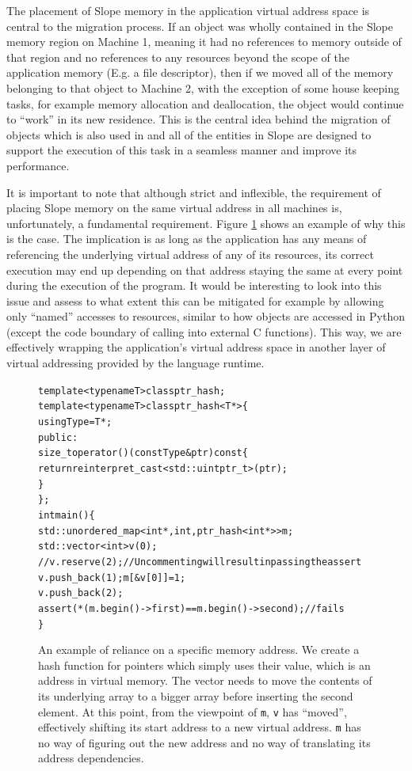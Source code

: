 The placement of Slope memory in the application virtual address space is
central to the migration process.  If an object was wholly contained
in the Slope memory region on Machine 1, meaning it had no references to memory
outside
of that region and no references to any resources beyond the
scope of the application memory (E.g. a file descriptor), then if we moved all
of the memory belonging to that object to Machine 2, with the exception of
some house keeping tasks, for example memory allocation and deallocation, the
object would continue to ``work'' in its new residence.
This is the central
idea behind the migration of objects which is also used in \cite{memon2018ramp}
and all of the entities in Slope are designed
to support the execution of this task in a seamless manner and improve its
performance.

It is important to note that although strict and inflexible, the requirement of
placing Slope memory on the same virtual address in all machines is,
unfortunately, a fundamental requirement. Figure \ref{fig:localmemorymanagementfundamental}
shows an example of why this is the case. The implication is as long as the
application has any means of referencing the underlying virtual address of any
of its resources, its correct execution may end up depending on that address
staying the same at every point during the execution of the program. It would
be interesting to look into this issue and assess to what extent this can be
mitigated for example by allowing only ``named'' accesses to resources, similar
to how objects are accessed in Python (except the code boundary of calling into
external C functions). This way, we are effectively wrapping the application's
virtual address space in another layer of virtual addressing provided by the
language runtime.


\begin{figure}
\begin{alltt}

template<typename T> class ptr_hash;
template<typename T> class ptr_hash<T*> \{
  using Type = T*;
 public:
  size_t operator()(const Type& ptr) const \{
    return reinterpret_cast<std::uintptr_t>(ptr);
  \}
\};
int main() \{
  std::unordered_map<int*, int, ptr_hash<int*>> m;
  std::vector<int> v(0);
  // v.reserve(2); // Uncommenting will result in passing the assert
  v.push_back(1); m[&v[0]] = 1;
  v.push_back(2);
  assert(*(m.begin()->first) == m.begin()->second); // fails
\}

\end{alltt}
\caption{
    An example of reliance on a specific memory address. We create a hash
    function for pointers which simply uses their value, which is an address
    in virtual memory. The vector needs to move the contents of its underlying array to a
    bigger array before inserting the second element. At this point, from the viewpoint of
    \texttt{m}, \texttt{v} has ``moved'', effectively shifting its start
    address to a new virtual address. \texttt{m} has no way of figuring out
    the new address and no way of translating its address dependencies.
}
\label{fig:localmemorymanagementfundamental}
\end{figure}




